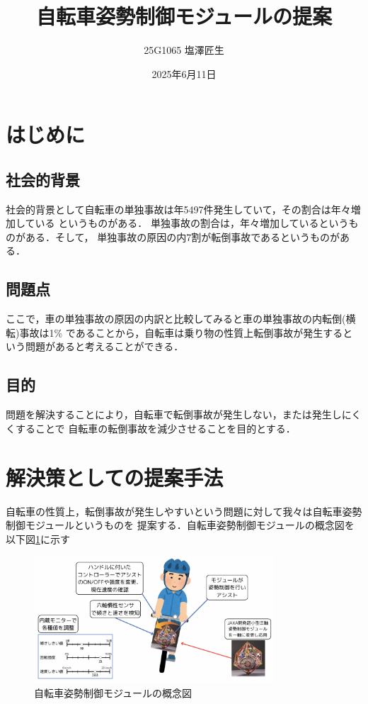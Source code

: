 \documentclass[uplatex,dvipdfmx]{jsarticle}
\begin{document}
\title{自転車姿勢制御モジュールの提案}
\author{25G1065 塩澤匠生}
\date{2025年6月11日}
\maketitle
\section{はじめに}

\subsection{社会的背景}

社会的背景として自転車の単独事故は年5497件発生していて，その割合は年々増加している
というものがある\cite{jikokensuu}．
単独事故の割合は，年々増加しているというものがある．そして，
単独事故の原因の内7割が転倒事故であるというものがある\cite{tandokuWariai}．

\subsection{問題点}

ここで，車の単独事故の原因の内訳と比較してみると車の単独事故の内転倒(横転)事故は1\%
であることから，自転車は乗り物の性質上転倒事故が発生するという問題があると考えることができる．




\subsection{目的}
問題を解決することにより，自転車で転倒事故が発生しない，または発生しにくくすることで
自転車の転倒事故を減少させることを目的とする．


\section{解決策としての提案手法}

自転車の性質上，転倒事故が発生しやすいという問題に対して我々は自転車姿勢制御モジュールというものを
提案する．自転車姿勢制御モジュールの概念図を以下図\ref{fig:moduleGainenn}に示す

\begin{figure}[H]
    \centering
    \includegraphics[width=0.8\textwidth]{fig/moduleGainenn2.png}
    \caption{自転車姿勢制御モジュールの概念図}
    \label{fig:moduleGainenn}
\end{figure}
\end{document}
